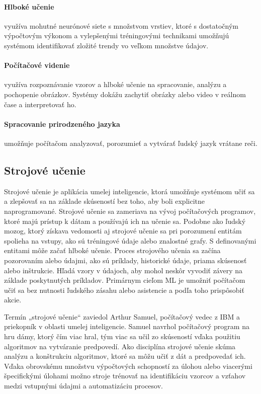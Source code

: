 \paragraph{Hlboké učenie} využíva mohutné neurónové siete s množstvom vrstiev, ktoré s dostatočným výpočtovým výkonom a vylepšenými tréningovými technikami umožňujú systémom identifikovať zložité trendy vo veľkom množstve údajov.

\paragraph{Počítačové videnie} využíva rozpoznávanie vzorov a hlboké učenie na spracovanie, analýzu a pochopenie obrázkov. Systémy dokážu zachytiť obrázky alebo video v reálnom čase a interpretovať ho.

\paragraph{Spracovanie prirodzeného jazyka} umožňuje počítačom analyzovať, porozumieť a vytvárať ľudský jazyk vrátane reči.

\subsection{Strojové učenie}
Strojové učenie je aplikácia umelej inteligencie, ktorá umožňuje systémom učiť sa a zlepšovať sa na základe skúseností bez toho, aby boli explicitne naprogramované. Strojové učenie sa zameriava na vývoj počítačových programov, ktoré majú prístup k dátam a používajú ich na učenie sa. Podobne ako ľudský mozog, ktorý získava vedomosti aj strojové učenie sa pri porozumení entitám spolieha na vstupy, ako sú tréningové údaje alebo znalostné grafy. S definovanými entitami môže začať hlboké učenie.
Proces strojového učenia sa začína pozorovaním alebo údajmi, ako sú príklady, historické údaje, priama skúsenosť alebo inštrukcie. Hľadá vzory v údajoch, aby mohol neskôr vyvodiť závery na základe poskytnutých príkladov. Primárnym cieľom ML je umožniť počítačom učiť sa bez nutnosti ľudského zásahu alebo asistencie a podľa toho prispôsobiť akcie.

Termín „strojové učenie“ zaviedol Arthur Samuel, počítačový vedec z IBM a priekopník v oblasti umelej inteligencie. Samuel navrhol počítačový program na hru dámy, ktorý čím viac hral, tým viac sa učil zo skúseností vďaka použitiu algoritmov na vytváranie predpovedí. Ako disciplína strojové učenie skúma analýzu a konštrukciu algoritmov, ktoré sa môžu učiť z dát a predpovedať ich. Vďaka obrovskému množstvu výpočtových schopností za úlohou alebo viacerými špecifickými úlohami možno stroje trénovať na identifikáciu vzorcov a vzťahov medzi vstupnými údajmi a automatizáciu procesov.

